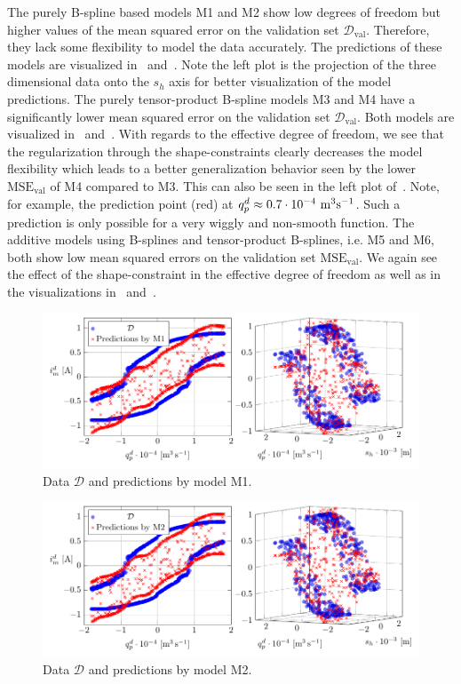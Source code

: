 The purely B-spline based models M1 and M2 show low degrees of freedom but higher values of the mean squared error on the validation set $\mathcal{D}_{\text{val}}$. Therefore, they lack some flexibility to model the data accurately. The predictions of these models are visualized in~ and~. Note the left plot is the projection of the three dimensional data onto the $s_h$ axis for better visualization of the model predictions. The purely tensor-product B-spline models M3 and M4 have a significantly lower mean squared error on the validation set $\mathcal{D}_{\text{val}}$. Both models are visualized in~ and~. With regards to the effective degree of freedom, we see that the regularization through the shape-constraints clearly decreases the model flexibility which leads to a better generalization behavior seen by the lower $\text{MSE}_{\text{val}}$ of M4 compared to M3. This can also be seen in the left plot of~. Note, for example, the prediction point (red) at $q_p^d \approx 0.7 \cdot 10^{-4} \ \si{\cubic m s^{-1}}$. Such a prediction is only possible for a very wiggly and non-smooth function. The additive models using B-splines and tensor-product B-splines, i.e. M5 and M6, both show low mean squared errors on the validation set $\text{MSE}_{\text{val}}$. We again see the effect of the shape-constraint in the effective degree of freedom as well as in the visualizations in~ and~. 

\begin{figure}[H]
	\centering 
	\includegraphics{graphics/pgfplots/cha5/Bosch/M1.pdf}
	\caption{Data $\mathcal{D}$ and predictions by model M1.}
	\label{fig:bosch-M1}
\end{figure}

\begin{figure}[H]
	\centering 
	\includegraphics{graphics/pgfplots/cha5/Bosch/M2.pdf}
	\caption{Data $\mathcal{D}$ and predictions by model M2.}
	\label{fig:bosch-M2}
\end{figure}

